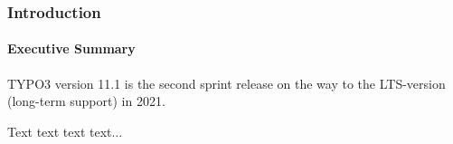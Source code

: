 %

\begin{frame}[fragile]
	\frametitle{Introduction}
	\framesubtitle{Executive Summary}

	\small
		TYPO3 version 11.1 is the second sprint release on the way to the LTS-version
		(long-term support) in 2021.

		\vspace{0.2cm}

		Text text text text...

	\normalsize

\end{frame}

